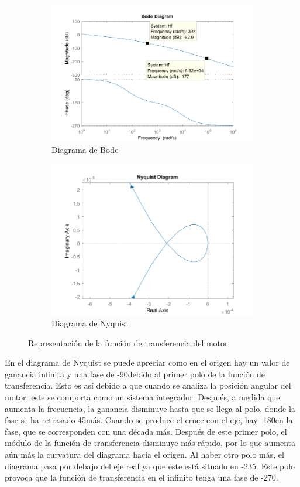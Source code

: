\documentclass[a4paper]{article}
\begin{document}
\begin{center}
	\begin{figure}[htp]
		\begin{subfigure}{1\textwidth}
			\centering
			\includegraphics[width=12cm]{bode}
			\caption{Diagrama de Bode}
		\end{subfigure}
		
		\begin{subfigure}{1\textwidth}
			\centering
			\includegraphics[width=12cm]{nyquist}
			\caption{Diagrama de Nyquist}
		\end{subfigure}
		\caption{Representación de la función de transferencia del motor}
		\label{bode}
	\end{figure}
\end{center}

En el diagrama de Nyquist se puede apreciar como en el origen hay un valor de ganancia infinita y una fase de -90\degree  debido al primer polo de la función de transferencia. Esto es así debido a que cuando se analiza la posición angular del motor, este se comporta como un sistema integrador. Después, a medida que aumenta la frecuencia, la ganancia disminuye hasta que se llega al polo, donde la fase se ha retrasado 45\degree  más. Cuando se produce el cruce con el eje, hay -180\degree  en la fase, que se corresponden con una década más. Después de este primer polo, el módulo de la función de transferencia disminuye más rápido, por lo que aumenta aún más la curvatura del diagrama hacia el origen. Al haber otro polo más, el diagrama pasa por debajo del eje real ya que este está situado en -235\degree. Este polo provoca que la función de transferencia en el infinito tenga una fase de -270\degree.
\end{document}
